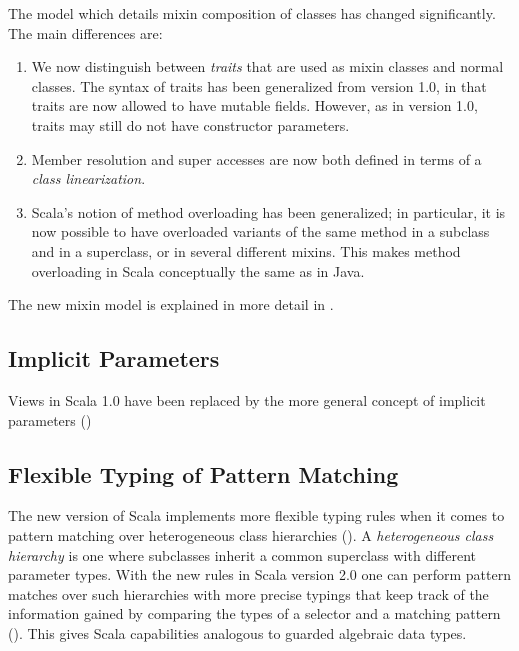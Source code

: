 The model which details mixin composition of classes has changed
significantly. The main differences are:
\begin{enumerate}
\item
We now distinguish between {\em traits} that are used as mixin classes
and normal classes. The syntax of traits has been generalized from
version 1.0, in that traits are now allowed to have mutable
fields. However, as in version 1.0, traits may still do not have
constructor parameters.
\item
Member resolution and super accesses are now both defined in terms of
a {\em class linearization}. 
\item
Scala's notion of method overloading has been generalized; in
 particular, it is now possible to have overloaded variants of the
 same method in a subclass and in a superclass, or in several different
 mixins. This makes method overloading in Scala conceptually the
 same as in Java.
\end{enumerate}
The new mixin model is explained in more detail in
.

\subsection*{Implicit Parameters}

Views in Scala 1.0 have been replaced by the more general concept of
implicit parameters ()

\subsection*{Flexible Typing of Pattern Matching}

The new version of Scala implements more flexible typing rules when it
comes to pattern matching over heterogeneous class hierarchies
(). A {\em heterogeneous class hierarchy} is
one where subclasses inherit a common superclass with different
parameter types.  With the new rules in Scala version 2.0 one can
perform pattern matches over such hierarchies with more precise
typings that keep track of the information gained by comparing the
types of a selector and a matching pattern ().
This gives Scala capabilities analogous to guarded algebraic data types.



